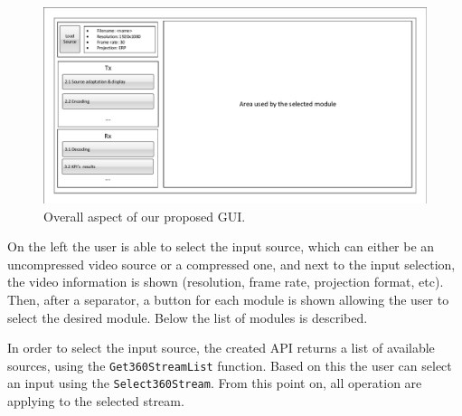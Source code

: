 \documentclass{article}
\begin{document}
\begin{figure}[ht]
    \centering
    \includegraphics[page=1,width=1\textwidth]{Drawings.pdf}
    \caption{Overall aspect of our proposed GUI.}
    \label{fig:overall_gui}
\end{figure}

On the left the user is able to select the input source, which can either be an uncompressed video source or a compressed one, and next to the input selection, the video information is shown (resolution, frame rate, projection format, etc). Then, after a separator, a button for each module is shown allowing the user to select the desired module. Below the list of modules is described.

In order to select the input source, the created API returns a list of available sources, using the \texttt{Get360StreamList} function. Based on this the user can select an input using the \texttt{Select360Stream}. From this point on, all operation are applying to the selected stream.


\end{document}

